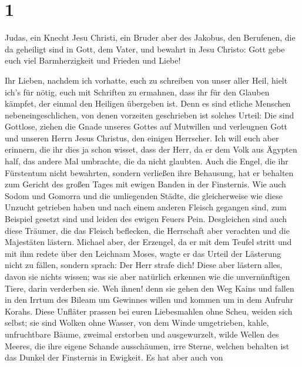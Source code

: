 \hypertarget{section}{%
\section{1}\label{section}}

 Judas, ein Knecht Jesu Christi, ein Bruder aber des
Jakobus, den Berufenen, die da geheiligt sind in Gott, dem Vater, und
bewahrt in Jesu Christo:  Gott gebe euch viel
Barmherzigkeit und Frieden und Liebe!

 Ihr Lieben, nachdem ich vorhatte, euch zu schreiben von
unser aller Heil, hielt ich's für nötig, euch mit Schriften zu ermahnen,
dass ihr für den Glauben kämpfet, der einmal den Heiligen übergeben ist.
 Denn es sind etliche Menschen nebeneingeschlichen, von
denen vorzeiten geschrieben ist solches Urteil: Die sind Gottlose,
ziehen die Gnade unseres Gottes auf Mutwillen und verleugnen Gott und
unseren Herrn Jesus Christus, den einigen Herrscher.  Ich
will euch aber erinnern, die ihr dies ja schon wisset, dass der Herr, da
er dem Volk aus Ägypten half, das andere Mal umbrachte, die da nicht
glaubten.  Auch die Engel, die ihr Fürstentum nicht
bewahrten, sondern verließen ihre Behausung, hat er behalten zum Gericht
des großen Tages mit ewigen Banden in der Finsternis.  Wie
auch Sodom und Gomorra und die umliegenden Städte, die gleicherweise wie
diese Unzucht getrieben haben und nach einem anderen Fleisch gegangen
sind, zum Beispiel gesetzt sind und leiden des ewigen Feuers Pein.
 Desgleichen sind auch diese Träumer, die das Fleisch
beflecken, die Herrschaft aber verachten und die Majestäten lästern.
 Michael aber, der Erzengel, da er mit dem Teufel stritt
und mit ihm redete über den Leichnam Moses, wagte er das Urteil der
Lästerung nicht zu fällen, sondern sprach: Der Herr strafe dich!
 Diese aber lästern alles, davon sie nichts wissen; was
sie aber natürlich erkennen wie die unvernünftigen Tiere, darin
verderben sie.  Weh ihnen! denn sie gehen den Weg Kains
und fallen in den Irrtum des Bileam um Gewinnes willen und kommen um in
dem Aufruhr Korahs.  Diese Unfläter prassen bei euren
Liebesmahlen ohne Scheu, weiden sich selbst; sie sind Wolken ohne
Wasser, von dem Winde umgetrieben, kahle, unfruchtbare Bäume, zweimal
erstorben und ausgewurzelt,  wilde Wellen des Meeres, die
ihre eigene Schande ausschäumen, irre Sterne, welchen behalten ist das
Dunkel der Finsternis in Ewigkeit.  Es hat aber auch von
